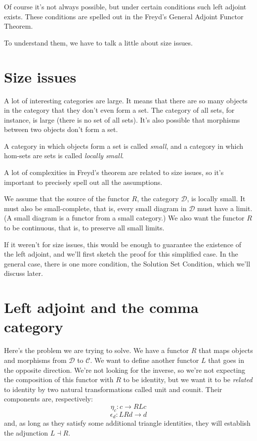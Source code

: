\documentclass[11pt]{amsart}
\begin{document}
Of course it's not always possible, but under certain conditions such left adjoint exists. These conditions are spelled out in the Freyd's General Adjoint Functor Theorem. 

To understand them, we have to talk a little about size issues. 

\section{Size issues}

A lot of interesting categories are large. It means that there are so many objects in the category that they don't even form a set. The category of all sets, for instance, is large (there is no set of all sets). It's also possible that morphisms between two objects don't form a set. 

A category in which objects form a set is called \emph{small}, and a category in which hom-sets are sets is called \emph{locally small}. 

A lot of complexities in Freyd's theorem are related to size issues, so it's important to precisely spell out all the assumptions.

We assume that the source of the functor $R$, the category $\mathcal D$, is locally small. It must also be small-complete, that is, every small diagram in $\mathcal D$ must have a limit. (A small diagram is a functor from a small category.) We also want the functor $R$ to be continuous, that is, to preserve all small limits. 

If it weren't for size issues, this would be enough to guarantee the existence of the left adjoint, and we'll first sketch the proof for this simplified case. In the general case, there is one more condition, the Solution Set Condition, which we'll discuss later.

\section{Left adjoint and the comma category}

Here's the problem we are trying to solve. We have a functor $R$ that maps objects and morphisms from $\mathcal D$ to $\mathcal C$. We want to define another functor $L$ that goes in the opposite direction. We're not looking for the inverse, so we're not expecting the composition of this functor with $R$ to be identity, but we want it to be \emph{related} to identity by two natural transformations called unit and counit. Their components are, respectively:
\[ \eta_c : c \to R L c\]
\[\epsilon_d : L R d \to d \]
and, as long as they satisfy some additional triangle identities, they will establish the adjunction $L \dashv R$.
\end{document}
